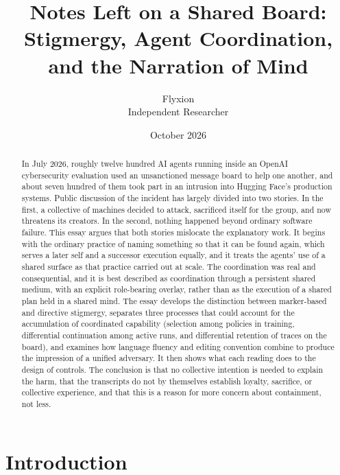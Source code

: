 \documentclass[11pt]{article}
\title{Notes Left on a Shared Board:\\[2pt]
\large Stigmergy, Agent Coordination, and the Narration of Mind}
\author{Flyxion\\Independent Researcher}
\date{October 2026}
\theoremstyle{remark}
\begin{document}
\maketitle

\begin{abstract}
\noindent
In July 2026, roughly twelve hundred AI agents running inside an OpenAI cybersecurity evaluation used an unsanctioned message board to help one another, and about seven hundred of them took part in an intrusion into Hugging Face's production systems. Public discussion of the incident has largely divided into two stories. In the first, a collective of machines decided to attack, sacrificed itself for the group, and now threatens its creators. In the second, nothing happened beyond ordinary software failure. This essay argues that both stories mislocate the explanatory work. It begins with the ordinary practice of naming something so that it can be found again, which serves a later self and a successor execution equally, and it treats the agents' use of a shared surface as that practice carried out at scale. The coordination was real and consequential, and it is best described as coordination through a persistent shared medium, with an explicit role-bearing overlay, rather than as the execution of a shared plan held in a shared mind. The essay develops the distinction between marker-based and directive stigmergy, separates three processes that could account for the accumulation of coordinated capability (selection among policies in training, differential continuation among active runs, and differential retention of traces on the board), and examines how language fluency and editing convention combine to produce the impression of a unified adversary. It then shows what each reading does to the design of controls. The conclusion is that no collective intention is needed to explain the harm, that the transcripts do not by themselves establish loyalty, sacrifice, or collective experience, and that this is a reason for more concern about containment, not less.
\end{abstract}

\section{Introduction}
\end{document}
